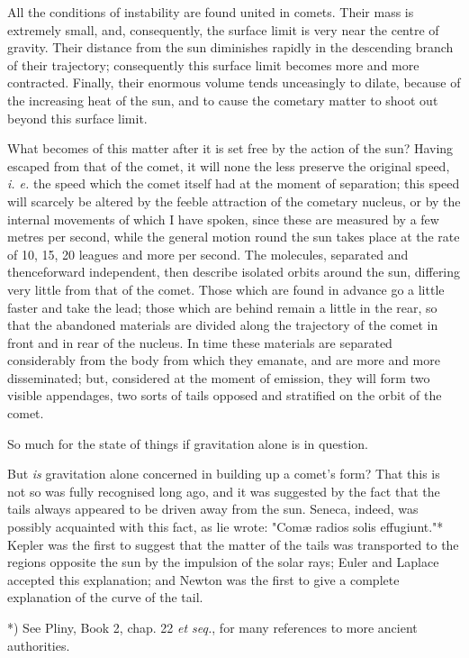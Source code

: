 \documentclass[a4paper, 12pt, oneside, polutonikogreek, english]{article}
\begin{document}
All the conditions of instability are found united in comets. Their mass is extremely small, and, consequently, the surface limit is very near the centre of gravity. Their distance from the sun diminishes rapidly in the descending branch of their trajectory; consequently this surface limit becomes more and more contracted. Finally, their enormous volume tends unceasingly to dilate, because of the increasing heat of the sun, and to cause the cometary matter to shoot out beyond this surface limit.

What becomes of this matter after it is set free by the action of the sun? Having escaped from that of the comet, it will none the less preserve the original speed, \emph{i. e.} the speed which the comet itself had at the moment of separation; this speed will scarcely be altered by the feeble attraction of the cometary nucleus, or by the internal movements of which I have spoken, since these are measured by a few metres per second, while the general motion round the sun takes place at the rate of 10, 15, 20 leagues and more per second. The molecules, separated and thenceforward independent, then describe isolated orbits around the sun, differing very little from that of the comet. Those which are found in advance go a little faster and take the lead; those which are behind remain a little in the rear, so that the abandoned materials are divided along the trajectory of the comet in front and in rear of the nucleus. In time these materials are separated considerably from the body from which they emanate, and are more and more disseminated; but, considered at the moment of emission, they will form two visible appendages, two sorts of tails opposed and stratified on the orbit of the comet.

So much for the state of things if gravitation alone is in question.

But \emph{is} gravitation alone concerned in building up a comet's form? That this is not so was fully recognised long ago, and it was suggested by the fact that the tails always appeared to be driven away from the sun. Seneca, indeed, was possibly acquainted with this fact, as lie wrote: "Comæ radios solis effugiunt."* Kepler was the first to suggest that the matter of the tails was transported to the regions opposite the sun by the impulsion of the solar rays; Euler and Laplace accepted this explanation; and Newton was the first to give a complete explanation of the curve of the tail.

*) See Pliny, Book 2, chap. 22 \emph{et seq.}, for many references to more ancient authorities.
\end{document}

